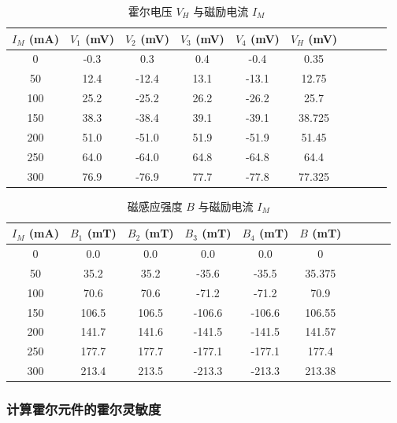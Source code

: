 \documentclass[UTF8]{article}
\theoremstyle{MyLineTheoremStyle} %
\theoremstyle{MyBlockTheoremStyle} %
\theoremstyle{MySubsubsectionStyle} %
\begin{document}
\begin{table}[H]\centering
    \caption{霍尔电压 $V_H$ 与磁励电流 $I_M$}
    \label{霍尔电压与磁励电流}
\begin{tabular}{cccccccccc}\toprule
    $I_M$ (mA) & $V_1$ (mV)  & $V_2$ (mV)  & $V_3$ (mV)   & $V_4$ (mV)   & $V_H$ (mV)    \\
    \midrule
    0	&-0.3	&0.3	&0.4	&-0.4	   &  0.35\\
    50	&12.4	&-12.4	&13.1	&-13.1	   & 12.75\\
    100	&25.2	&-25.2	&26.2	&-26.2	   &  25.7\\
    150	&38.3	&-38.4	&39.1	&-39.1	   &38.725\\
    200	&51.0	&-51.0	&51.9	&-51.9	   & 51.45\\
    250	&64.0	&-64.0	&64.8	&-64.8	   &  64.4\\
    300	&76.9	&-76.9	&77.7	&-77.8	   &77.325\\
    \bottomrule
\end{tabular}
\end{table}\vspace*{-2mm}
\begin{table}[H]\centering
    \caption{磁感应强度 $B$ 与磁励电流 $I_M$}
    \label{磁感应强度与磁励电流}
\begin{tabular}{cccccccccc}\toprule
    $I_M$ (mA) & $B_1$ (mT)  & $B_2$ (mT)  & $B_3$ (mT)   & $B_4$ (mT)   & $B$ (mT)    \\
    \midrule
    0	&0.0	&0.0	&0.0	&0.0	    &     0\\
    50	&35.2	&35.2	&-35.6	&-35.5	    &35.375\\
    100	&70.6	&70.6	&-71.2	&-71.2	    &  70.9\\
    150	&106.5	&106.5	&-106.6	&-106.6	    &106.55\\
    200	&141.7	&141.6	&-141.5	&-141.5	    &141.57\\
    250	&177.7	&177.7	&-177.1	&-177.1	    & 177.4\\
    300	&213.4	&213.5	&-213.3	&-213.3	    &213.38\\
    \bottomrule
\end{tabular}
\end{table}



\subsubsection{计算霍尔元件的霍尔灵敏度}
\end{document}

